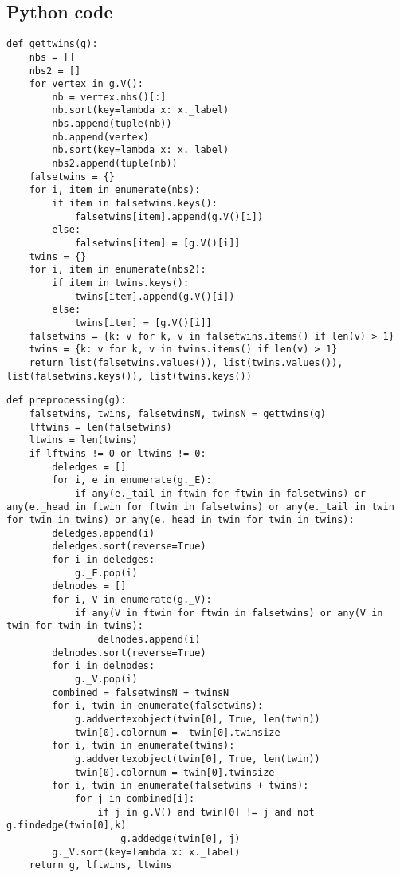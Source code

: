 \documentclass[twoside]{article}
\theoremstyle{definition}
\theoremstyle{plain}
\begin{document}
\begin{appendices}

\section{Python code}
\lstset{language=Python}
\begin{lstlisting}[label={gettwins}]
def gettwins(g):
	nbs = []
	nbs2 = []
	for vertex in g.V():
		nb = vertex.nbs()[:]
		nb.sort(key=lambda x: x._label)
		nbs.append(tuple(nb))
		nb.append(vertex)
		nb.sort(key=lambda x: x._label)
		nbs2.append(tuple(nb))
	falsetwins = {}
	for i, item in enumerate(nbs):
		if item in falsetwins.keys():
			falsetwins[item].append(g.V()[i])
		else:
			falsetwins[item] = [g.V()[i]]
	twins = {}
	for i, item in enumerate(nbs2):
		if item in twins.keys():
			twins[item].append(g.V()[i])
		else:
			twins[item] = [g.V()[i]]
	falsetwins = {k: v for k, v in falsetwins.items() if len(v) > 1}
	twins = {k: v for k, v in twins.items() if len(v) > 1}
	return list(falsetwins.values()), list(twins.values()), list(falsetwins.keys()), list(twins.keys())   
\end{lstlisting}


\begin{lstlisting}[label={preprocessing}]
def preprocessing(g):
	falsetwins, twins, falsetwinsN, twinsN = gettwins(g)
	lftwins = len(falsetwins)
	ltwins = len(twins)
	if lftwins != 0 or ltwins != 0:
		deledges = []
		for i, e in enumerate(g._E):
			if any(e._tail in ftwin for ftwin in falsetwins) or any(e._head in ftwin for ftwin in falsetwins) or any(e._tail in twin for twin in twins) or any(e._head in twin for twin in twins):
		deledges.append(i)
		deledges.sort(reverse=True)
		for i in deledges:
			g._E.pop(i)
		delnodes = []
		for i, V in enumerate(g._V):
			if any(V in ftwin for ftwin in falsetwins) or any(V in twin for twin in twins):
				delnodes.append(i)
		delnodes.sort(reverse=True)
		for i in delnodes:
			g._V.pop(i)
		combined = falsetwinsN + twinsN
		for i, twin in enumerate(falsetwins):
			g.addvertexobject(twin[0], True, len(twin))
			twin[0].colornum = -twin[0].twinsize
		for i, twin in enumerate(twins):
			g.addvertexobject(twin[0], True, len(twin))
			twin[0].colornum = twin[0].twinsize
		for i, twin in enumerate(falsetwins + twins):
			for j in combined[i]:
				if j in g.V() and twin[0] != j and not g.findedge(twin[0],k)
					g.addedge(twin[0], j)
		g._V.sort(key=lambda x: x._label)
	return g, lftwins, ltwins
\end{lstlisting}


\end{appendices}
\end{document}
